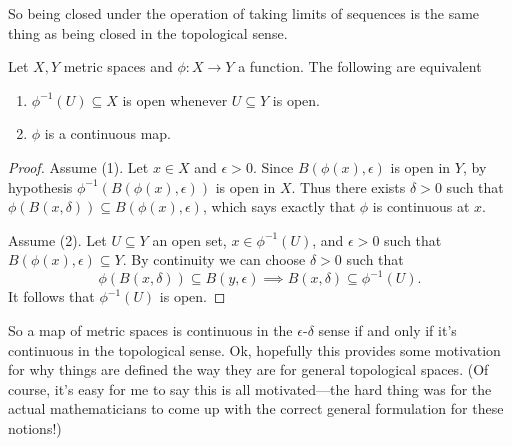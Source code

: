 So being closed under the operation of taking limits of sequences is
the same thing as being closed in the topological sense.

\begin{proposition}
  Let $X, Y$ metric spaces and $\phi : X \to Y$ a function. The
  following are equivalent
  \begin{enumerate}
  \item $\phi^{-1}(U) \subseteq X$ is open whenever $U \subseteq Y$ is
    open.
  \item $\phi$ is a continuous map.
  \end{enumerate}
\end{proposition}

\begin{proof}
  Assume (1). Let $x \in X$ and $\epsilon > 0$. Since
  $B(\phi(x),\epsilon)$ is open in $Y$, by hypothesis
  $\phi^{-1}(B(\phi(x), \epsilon))$ is open in $X$. Thus there exists
  $\delta > 0$ such that $\phi(B(x, \delta)) \subseteq B(\phi(x),
  \epsilon)$, which says exactly that $\phi$ is continuous at $x$.

  Assume (2). Let $U \subseteq Y$ an open set, $x \in \phi^{-1}(U)$,
  and $\epsilon > 0$ such that $B(\phi(x),\epsilon) \subseteq Y$. By
  continuity we can choose $\delta > 0$ such that
  \[
  \phi(B(x,\delta)) \subseteq B(y,\epsilon) \implies B(x,\delta)
  \subseteq \phi^{-1}(U).
  \]
  It follows that $\phi^{-1}(U)$ is open.
\end{proof}

So a map of metric spaces is continuous in the $\epsilon$-$\delta$
sense if and only if it's continuous in the topological sense. Ok,
hopefully this provides some motivation for why things are defined the
way they are for general topological spaces. (Of course, it's easy for
me to say this is all motivated---the hard thing was for the actual
mathematicians to come up with the correct general formulation for
these notions!)




